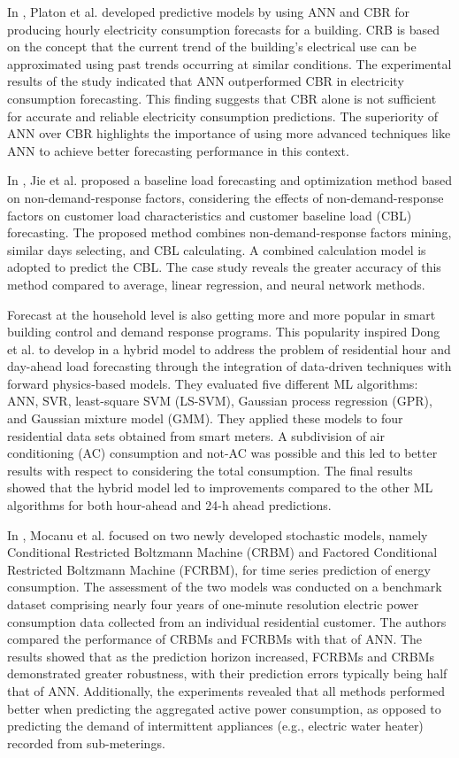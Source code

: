 In \cite{PLATON201510}, Platon et al. developed predictive models by using ANN and CBR for producing hourly electricity consumption forecasts for a building.
CRB is based on the concept that the current trend of the building's electrical use can be approximated using past trends occurring at similar conditions.
The experimental results of the study indicated that ANN outperformed CBR in electricity consumption forecasting.
This finding suggests that CBR alone is not sufficient for accurate and reliable electricity consumption predictions.
The superiority of ANN over CBR highlights the importance of using more advanced techniques like ANN to achieve better forecasting performance in this context.

In \cite{7576207}, Jie et al. proposed a baseline load forecasting and optimization method based on non-demand-response factors, considering the effects of non-demand-response factors on customer load characteristics and customer baseline load (CBL) forecasting.
The proposed method combines non-demand-response factors mining, similar days selecting, and CBL calculating.
A combined calculation model is adopted to predict the CBL.
The case study reveals the greater accuracy of this method compared to average, linear regression, and neural network methods.

Forecast at the household level is also getting more and more popular in smart building control and demand response programs.
This popularity inspired Dong et al. to develop in \cite{DONG2016341} a hybrid model to address the problem of residential hour and day-ahead load forecasting through the integration of data-driven techniques with forward physics-based models.
They evaluated five different ML algorithms: ANN, SVR, least-square SVM (LS-SVM), Gaussian process regression (GPR), and Gaussian mixture model (GMM).
They applied these models to four residential data sets obtained from smart meters.
A subdivision of air conditioning (AC) consumption and not-AC was possible and this led to better results with respect to considering the total consumption.
The final results showed that the hybrid model led to improvements compared to the other ML algorithms for both hour-ahead and 24-h ahead predictions.

In \cite{MOCANU201691}, Mocanu et al. focused on two newly developed stochastic models, namely Conditional Restricted Boltzmann Machine (CRBM) and Factored Conditional Restricted Boltzmann Machine (FCRBM), for time series prediction of energy consumption.
The assessment of the two models was conducted on a benchmark dataset comprising nearly four years of one-minute resolution electric power consumption data collected from an individual residential customer.
The authors compared the performance of CRBMs and FCRBMs with that of ANN.
The results showed that as the prediction horizon increased, FCRBMs and CRBMs demonstrated greater robustness, with their prediction errors typically being half that of ANN.
Additionally, the experiments revealed that all methods performed better when predicting the aggregated active power consumption, as opposed to predicting the demand of intermittent appliances (e.g., electric water heater) recorded from sub-meterings.

